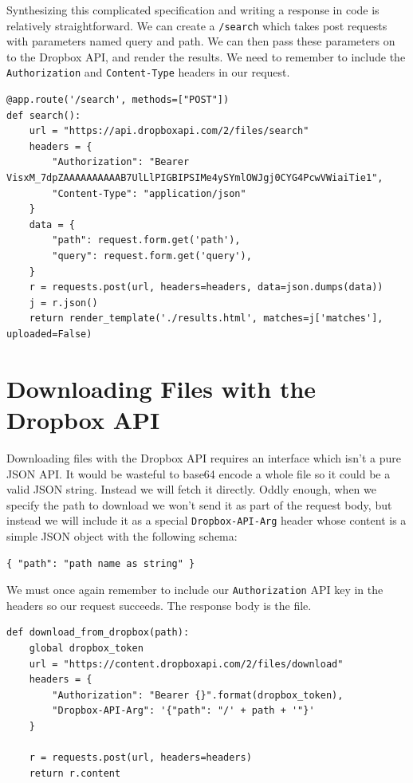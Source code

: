 \documentclass[12pt]{article}
\begin{document}
Synthesizing this complicated specification and writing a response in code is relatively straightforward. We can create a \texttt{/search} which takes post requests with parameters named query and path. We can then pass these parameters on to the Dropbox API, and render the results. We need to remember to include the \texttt{Authorization} and \texttt{Content-Type} headers in our request.
\begin{lstlisting}
@app.route('/search', methods=["POST"])
def search():
    url = "https://api.dropboxapi.com/2/files/search"
    headers = {
        "Authorization": "Bearer VisxM_7dpZAAAAAAAAAAB7UlLlPIGBIPSIMe4ySYmlOWJgj0CYG4PcwVWiaiTie1",
        "Content-Type": "application/json"
    }
    data = {
        "path": request.form.get('path'),
        "query": request.form.get('query'),
    }
    r = requests.post(url, headers=headers, data=json.dumps(data))
    j = r.json()
    return render_template('./results.html', matches=j['matches'], uploaded=False)
\end{lstlisting}

\section{Downloading Files with the Dropbox API}
Downloading files with the Dropbox API requires an interface which isn't a pure JSON API. It would be wasteful to base64 encode a whole file so it could be a valid JSON string. Instead we will fetch it directly. Oddly enough, when we specify the path to download we won't send it as part of the request body, but instead we will include it as a special \texttt{Dropbox-API-Arg} header whose content is a simple JSON object with the following schema:
\begin{verbatim}
{ "path": "path name as string" }
\end{verbatim}

We must once again remember to include our \texttt{Authorization} API key in the headers so our request succeeds. The response body is the file.

\begin{lstlisting}
def download_from_dropbox(path):
    global dropbox_token
    url = "https://content.dropboxapi.com/2/files/download"
    headers = {
        "Authorization": "Bearer {}".format(dropbox_token),
        "Dropbox-API-Arg": '{"path": "/' + path + '"}'
    }

    r = requests.post(url, headers=headers)
    return r.content
\end{lstlisting}
\end{document}

